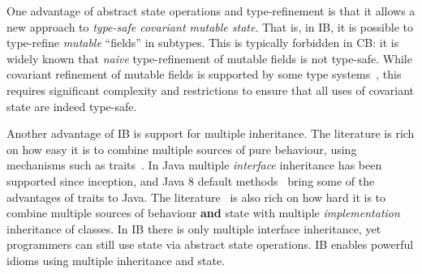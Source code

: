 One advantage of abstract state operations and
type-refinement is that it allows a new approach to
\emph{type-safe covariant mutable state}. That is, in IB,
it is possible to type-refine \emph{mutable} ``fields'' in subtypes. This is
typically forbidden in CB: it is widely known that \emph{naive} type-refinement of
mutable fields is not type-safe. While covariant refinement of mutable
fields is supported by some type systems~\cite{bruce98astatically,bruce1994paradigmatic,ernst06virtual,Saito2013933}, this requires
significant complexity and restrictions to ensure that all uses of
covariant state are indeed type-safe.

\begin{comment}
\marcoT{%

In this paper we show how to support type-safe
\textbf{field removal},
\textbf{field type refinement} allowing a kind of covariant setters refinement,
and \textbf{multiple inheritance}.}
\end{comment}

Another advantage of IB is support for
multiple inheritance. The literature is rich on how
easy it is to combine multiple sources of pure behaviour,
using mechanisms such as traits~\cite{scharli03traits}. In Java
multiple \emph{interface} inheritance has been supported since
inception, and Java 8 default methods~\cite{goetz12fdefenders} bring some of the
advantages of traits to Java. The literature~\cite{Sak89dis,bracha90mixin,malayeri2009cz}
is also rich on how hard it is to combine multiple sources
of behaviour \textbf{and} state with multiple \emph{implementation}
inheritance of classes. In IB there is only multiple
interface inheritance, yet programmers can still use state via 
abstract state operations. IB enables powerful
idioms using multiple inheritance and state.



